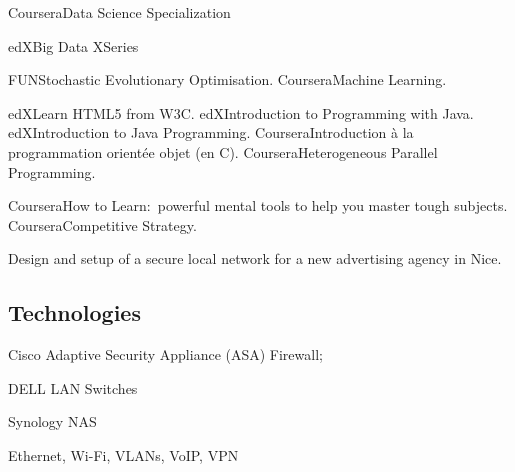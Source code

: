    {Coursera}{Data Science Specialization}


   {edX}{Big Data XSeries}

   {FUN}{Stochastic Evolutionary Optimisation.}
   {Coursera}{Machine Learning.}

   
   {edX}{Learn HTML5 from W3C.}
   {edX}{Introduction to Programming with Java.}
   {edX}{Introduction to Java Programming.}
   {Coursera}{Introduction \`a la programmation orient\'ee objet (en C\plusplus).}
   {Coursera}{Heterogeneous Parallel Programming.}


   {Coursera}{How to Learn:~powerful mental tools to help you master tough subjects.}
   {Coursera}{Competitive Strategy.}


\bigskip
{}

\noindent
Design and setup of a secure local network for a new advertising agency in Nice.

\subsection{Technologies}

\item{\bdot} Cisco Adaptive Security Appliance (ASA) Firewall;
\item{\bdot} DELL LAN Switches
\item{\bdot} Synology NAS
\item{\bdot} Ethernet, Wi-Fi, VLANs, VoIP, VPN

